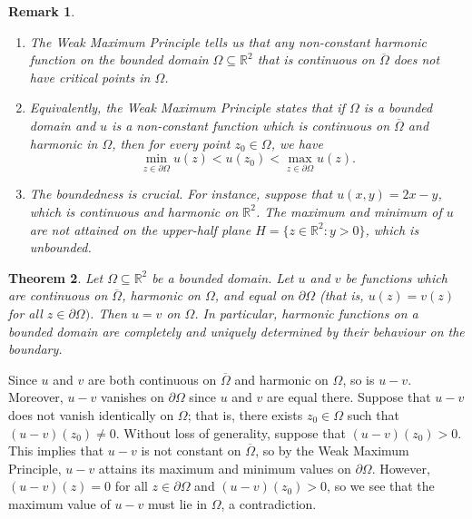 \documentclass[10pt]{article}
\makeatletter
\newcommand{\R}{\mathbb{R}}
\theoremstyle{newstyle}
\newtheorem{thm}{Theorem}[section]
\newtheorem{remark}[thm]{Remark}
\newenvironment{pf}[1][\proofname]{\par
  \pushQED{\qed}%
  \normalfont \topsep0\p@\relax
  \trivlist
  \item[\hskip\labelsep\scshape
  #1\@addpunct{.}]\ignorespaces
}{%
  \popQED\endtrivlist\@endpefalse
}
\makeatother
\begin{document}
\begin{remark}~
\begin{enumerate}[(1)]
    \item The Weak Maximum Principle tells us that any non-constant harmonic function on 
    the bounded domain $\Omega \subseteq \R^2$ that is continuous on $\overline\Omega$ 
    does not have critical points in $\Omega$.
    \item Equivalently, the Weak Maximum Principle states that if $\Omega$ is a bounded 
    domain and $u$ is a non-constant function which is continuous on $\overline\Omega$ and 
    harmonic in $\Omega$, then for every point $z_0 \in \Omega$, we have 
    \[ \min_{z \in \partial\Omega} u(z) < u(z_0) < \max_{z \in \partial\Omega} u(z). \]
    \item The boundedness is crucial. For instance, suppose that $u(x, y) = 2x-y$, which is 
    continuous and harmonic on $\R^2$. The maximum and minimum of $u$ are not attained 
    on the upper-half plane $H = \{z \in \R^2 : y > 0\}$, which is unbounded. 
\end{enumerate}
\end{remark}

\begin{thm}
Let $\Omega \subseteq \R^2$ be a bounded domain. Let $u$ and $v$ be functions which are 
continuous on $\overline\Omega$, harmonic on $\Omega$, and equal on $\partial\Omega$ 
(that is, $u(z) = v(z)$ for all $z \in \partial\Omega)$. Then $u = v$ on $\Omega$. In particular, 
harmonic functions on a bounded domain are completely and uniquely determined by their 
behaviour on the boundary.
\end{thm}
\begin{pf}
Since $u$ and $v$ are both continuous on $\overline\Omega$ and harmonic on $\Omega$, 
so is $u-v$. Moreover, $u-v$ vanishes on $\partial\Omega$ since $u$ and $v$ are equal there. 
Suppose that $u - v$ does not vanish identically on $\Omega$; that is, there exists 
$z_0 \in \Omega$ such that $(u - v)(z_0) \neq 0$. Without loss of generality, 
suppose that $(u - v)(z_0) > 0$. This implies that $u-v$ is not constant on 
$\overline\Omega$, so by the Weak Maximum Principle, $u - v$ attains its maximum and 
minimum values on $\partial\Omega$. However, $(u-v)(z) = 0$ for all $z \in \partial\Omega$ 
and $(u - v)(z_0) > 0$, so we see that the maximum value of $u - v$ must lie in 
$\Omega$, a contradiction.
\end{pf}
\end{document}

